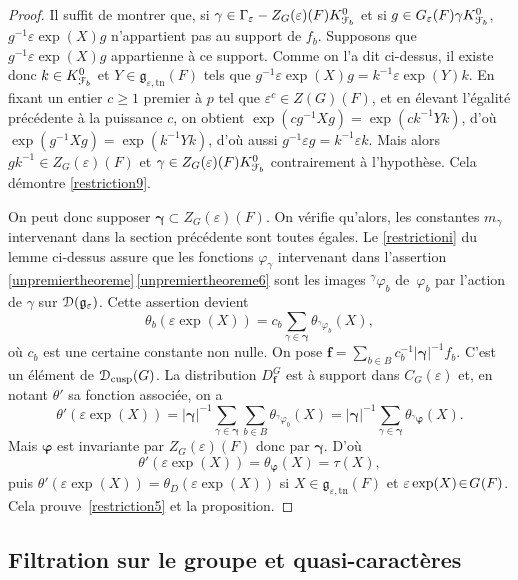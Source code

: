 \documentclass[11pt]{article}
\numberwithin{equation}{section}\providecommand{\og}{«\,}\providecommand{\fg}{\,»}
\let\mathcal \EuScript
\newcommand{\NoChangel}[1]{%
\expandafter\let\csname old\string#1\endcsname=#1
\let#1=\relax
\newcommand{#1}{\mathcode`l="716C\csname old\string#1\endcsname\mathcode`l="7160 }%
}
\let\epsilon\varepsilon
\newcommand{\frg}{\mathfrak{g}}
\newcommand{\cusp}{\mathrm{cusp}}
\newcommand{\rell}{\mathrm{ell}} \NoChangel{\rell}
\newcommand{\tn}{\mathrm{tn}}
\newcommand{\bmf}{\boldsymbol{f}}
\newcommand{\cD}{\mathcal{D}}
\newcommand{\cF}{\mathcal{F}}
\theoremstyle{plain}
\theoremstyle{definition}
\begin{document}
\begin{proof}
Il suffit de montrer que, si $\gamma\in \Gamma_{\epsilon}-Z_{G}(\epsilon)(F)K_{\cF_{b}}^0$ et si $g\in G_{\epsilon}(F)\gamma K_{\cF_{b}}^0$, $g^{-1}\epsilon \exp(X) g$ n'appartient pas au support de $f_{b}$. Supposons que $g^{-1}\epsilon \exp(X) g$ appartienne à ce support. Comme on l'a dit ci-dessus, il existe donc $k\in K_{\cF_{b}}^0$ et $Y\in \frg_{\epsilon,\tn}(F)$ tels que $g^{-1}\epsilon \exp(X)g=k^{-1}\epsilon \exp(Y)k$. En fixant un entier $c\geq1$ premier à $p$ tel que $\epsilon^c\in Z(G)(F)$, et en élevant l'égalité précédente à la puissance $c$, on obtient
$\exp(cg^{-1}Xg)=\exp(ck^{-1}Yk)$, d'où $\exp(g^{-1}Xg)=\exp(k^{-1}Yk)$, d'où aussi $g^{-1}\epsilon g=k^{-1} \epsilon k$. Mais alors $gk^{-1}\in Z_{G}(\epsilon)(F)$ et $\gamma\in Z_{G}(\epsilon)(F)K_{\cF_{b}}^0 $ contrairement à l'hypothèse. Cela démontre \eqref{restriction9}.

On peut donc supposer $\boldsymbol{\gamma}\subset Z_{G}(\epsilon)(F)$. On vérifie qu'alors, les constantes $m_{\gamma}$ intervenant dans la section précédente sont toutes égales. Le \eqref{restrictioni} du lemme ci-dessus assure que les fonctions $\varphi_{\gamma}$ intervenant dans l'assertion \ref{unpremiertheoreme}\,\eqref{unpremiertheoreme6} sont les images $^{\gamma}\varphi_{b}$ de~$\varphi_{b}$ par l'action de $\gamma$ sur $\cD(\frg_{\epsilon})$. Cette assertion
devient
\[
\theta_{b}(\epsilon \exp(X))=c_{b} \sum_{\gamma\in \boldsymbol{\gamma}}
\theta_{^{\gamma}\varphi_{b}}(X),
\]
où $c_{b}$ est une certaine constante non nulle.
On pose $\bmf=\sum_{b\in B}c_{b}^{-1}\vert \boldsymbol{\gamma}\vert^{-1} f_{b}$. C'est un élément de $\cD_{\cusp}(G)$.
La distribution $D^G_{\bmf}$ est à support dans $C_{G}(\epsilon)$ et, en notant $\theta'$ sa fonction associée, on a
\[
\theta'(\epsilon \exp(X))= \vert \boldsymbol{\gamma}\vert ^{-1}\sum_{\gamma\in \boldsymbol{\gamma}}\sum_{b\in B}\theta_{^{\gamma}\varphi_{b}}(X)=\vert \boldsymbol{\gamma}\vert ^{-1}\sum_{\gamma\in \boldsymbol{\gamma}}\theta_{^{\gamma}\boldsymbol{\varphi}}(X).
\]
Mais $\boldsymbol{\varphi}$ est invariante par $Z_{G}(\epsilon)(F)$ donc par $\boldsymbol{\gamma}$. D'où
\[
\theta'(\epsilon \exp(X))=\theta_{\boldsymbol{\varphi}}(X)=\tau(X),
\]
puis $\theta'(\epsilon \exp(X))\!=\!\theta_{D}(\epsilon \exp(X))$ si $X\!\in\!\frg_{\epsilon,\tn}(F)$ et $\epsilon \exp(X)\!\in\!G_{\rell}(F)$. Cela prouve~\eqref{restriction5} et la proposition.
\end{proof}

\subsection{Filtration sur le groupe et quasi-caractères}\label{filtrationsurlegroupe}
\end{document}
